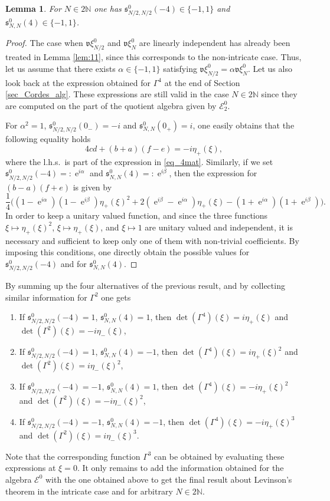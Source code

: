 \documentclass[11pt]{article}
\def\EE{\mathscr E}
\def\N{\mathbb N}
\def\s{\mathfrak s}
\def\v{\mathfrak v}
\def\e{\mathop{\mathrm{e}}\nolimits}
\newtheorem{Lemma}[Theorem]{Lemma}
\begin{document}
\begin{Lemma}
For $N\in 2\N$ one has $\s^0_{N/2,N/2}(-4)\in \{-1,1\}$ and 
$\s^0_{N,N}(4)\in \{-1,1\}$.
\end{Lemma}

\begin{proof}
The case when $\v\xi^0_{N/2}$ and $\v\xi^0_{N}$ are linearly independent
has already been treated in Lemma \ref{lem:11}, since this corresponds to the non-intricate case.
Thus, let us assume that  there exists $\alpha\in \{-1,1\}$ satisfying $\v\xi^0_{N/2}=\alpha \v \xi^0_N$. Let us also look back at the expression obtained for $\Gamma^4$ at the end of Section \ref{sec_Cordes_alg}. These expressions are still valid in the case $N\in 2\N$
since they are computed on the part of the quotient algebra given by $\EE^0_2$.

For $\alpha^2=1$,  $\s^0_{N/2,N/2}(0_-) = -i$ and $\s^0_{N,N}(0_+) =  i$, one easily obtains that the following equality holds
$$
4cd+(b+a)(f-e)=-i\eta_+(\xi),
$$
where the l.h.s.~is part of the expression in \eqref{eq_4mat}.
Similarly, if we set $\s^0_{N/2,N/2}(-4)=:\e^{i\alpha}$ and $\s^0_{N,N}(4)=:\e^{i\beta}$, then the expression for $(b-a)(f+e)$ is given by
$$
\frac{1}{4}\Big( (1-\e^{i\alpha})(1-\e^{i\beta})\eta_+(\xi)^2+
2(\e^{i\beta}-\e^{i\alpha})\eta_+(\xi) -(1+\e^{i\alpha})(1+\e^{i\beta})\Big).
$$
In order to keep a unitary valued function, and since the three functions
$\xi\mapsto \eta_+(\xi)^2$, $\xi \mapsto \eta_+(\xi)$, and $\xi \mapsto 1$
are unitary valued and independent, it is necessary and sufficient to keep only 
one of them with non-trivial coefficients. 
By imposing this conditions, one directly obtain the possible values for $\s^0_{N/2,N/2}(-4)$ and for $\s^0_{N,N}(4)$.
\end{proof}

By summing up the four alternatives of the previous result, and by collecting similar information for $\Gamma^2$ one gets
\begin{enumerate}
\item[$(i)$]  If $\s^0_{N/2,N/2}(-4)=1$, $\s^0_{N,N}(4)=1$, then $\det(\Gamma^4)(\xi)=i\eta_+(\xi)$ and $\det(\Gamma^2)(\xi)=-i\eta_-(\xi)$,
\item[$(ii)$] If $\s^0_{N/2,N/2}(-4)=1$, $\s^0_{N,N}(4)=-1$, then $\det(\Gamma^4)(\xi)=i\eta_+(\xi)^2$ and $\det(\Gamma^2)(\xi)=i\eta_-(\xi)^2$,
\item[$(iii)$] If $\s^0_{N/2,N/2}(-4)=-1$, $\s^0_{N,N}(4)=1$, then $\det(\Gamma^4)(\xi)=-i\eta_+(\xi)^2$ and $\det(\Gamma^2)(\xi)=-i\eta_-(\xi)^2$,
\item[$(iv)$] If $\s^0_{N/2,N/2}(-4)=-1$, $\s^0_{N,N}(4)=-1$, then $\det(\Gamma^4)(\xi)=-i\eta_+(\xi)^3$ and $\det(\Gamma^2)(\xi)=i\eta_-(\xi)^3$.
\end{enumerate}
Note that the corresponding function $\Gamma^3$ can be obtained by evaluating these expressions at $\xi=0$.
It only remains to add the information obtained for the algebra $\EE^0$ with the one obtained above to get the final result about Levinson's theorem in the intricate case and for arbitrary $N\in 2\N$.
\end{document}
